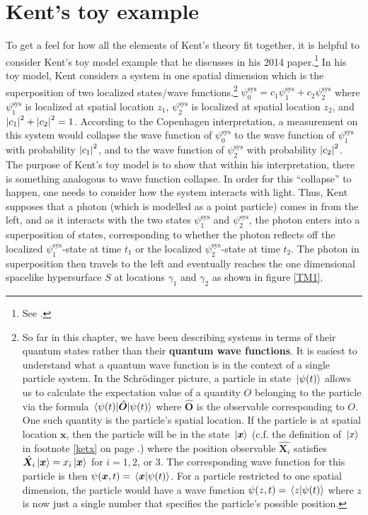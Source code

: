 \section{Kent's toy example}\label{toysection}
To get a feel for how all the elements of Kent's theory fit together, it is helpful to consider Kent's toy model example that he discusses in his 2014 paper.\footnote{See \cite[p.3--4]{Kent2014}.} In his toy model, Kent considers a system in one spatial dimension which is the superposition of two localized states/wave functions.\footnote{So far in this chapter, we have been describing systems in terms of their quantum states rather than their \textbf{quantum wave functions}. It is easiest to understand what a quantum wave function is in the context of a single particle system. In the Schr\"{o}dinger picture, a particle in state $\ket*{\psi(t)}$ allows us to calculate the expectation value of a quantity $O$ belonging to the particle via the formula $\ev{\hat{\bm{O}}}{\psi(t)}$ where $\hat{\bm{O}}$ is the observable corresponding to $O$. One such quantity is the particle's spatial location. If the particle is at spatial location $\bm{x}$, then the particle will be in the state $\ket*{\bm{x}}$ (c.f. the definition of $\ket*{x}$ in footnote \ref{ketx} on page \pageref{ketx}.) where the position observable $\hat{\bm{X}_i}$ satisfies $\hat{\bm{X}_i}\ket*{\bm{x}}=x_i\ket*{\bm{x}}$ for $i=1,2$, or $3$. The corresponding wave function for this particle is then   $\psi(\bm{x}, t)=\ip*{\bm{x}}{\psi(t)}$. For a particle restricted to one spatial dimension, the particle would have a wave function $\psi(z, t)=\ip*{z}{\psi(t)}$ where $z$ is now just a single number that specifies the particle's possible position.}  $\psi_0^\text{sys}=c_1 \psi_1^\text{sys}+c_2\psi_2^\text{sys}$ where $\psi_1^\text{sys}$ is localized at spatial location $z_1$, $\psi_2^\text{sys}$ is localized at spatial location $z_2$, and $\abs{c_1}^2+\abs{c_2}^2=1$. According to the Copenhagen interpretation, a measurement on this system would collapse the wave function of $\psi_0^\text{sys}$ to the wave function of $\psi_1^\text{sys}$ with probability $\abs{c_1}^2$, and to the wave function of $\psi_2^\text{sys}$ with probability $\abs{c_2}^2$. The purpose of Kent's toy model is to show that within his interpretation, there is something analogous to wave function collapse.  In order for this ``collapse'' to happen, one needs to consider how the system interacts with light. Thus, Kent supposes that a photon (which is modelled as a point particle) comes in from the left, and as it interacts with the two states $\psi_1^\text{sys}$ and $\psi_2^\text{sys}$, the photon enters into a superposition of states, corresponding to whether the photon reflects off the localized $\psi_1^\text{sys}$-state at time $t_1$ or the localized $\psi_2^\text{sys}$-state at time $t_2$. The photon in superposition then travels to the left and eventually reaches the one dimensional spacelike hypersurface $S$ at locations $\gamma_1$ and $\gamma_2$ as shown in figure  \ref{TM1}.

